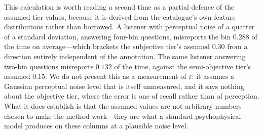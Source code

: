 This calculation is worth reading a second time as a partial defence of the
assumed tier values, because it is derived from the catalogue's own feature
distributions rather than borrowed. A listener with perceptual noise of a
quarter of a standard deviation, answering four-bin questions, misreports the
bin $0.288$ of the time on average---which brackets the subjective tier's
assumed $0.30$ from a direction entirely independent of the annotation. The
same listener answering two-bin questions misreports $0.132$ of the time,
against the semi-objective tier's assumed $0.15$. We do not present this as a
measurement of $\varepsilon$: it assumes a Gaussian perceptual noise level that
is itself unmeasured, and it says nothing about the objective tier, where the
error is one of recall rather than of perception. What it does establish is
that the assumed values are not arbitrary numbers chosen to make the method
work---they are what a standard psychophysical model produces on these
columns at a plausible noise level.
